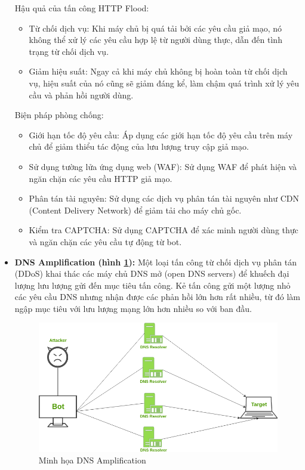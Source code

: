 \documentclass[a4paper]{article}
\begin{document}
\begin{itemize}
\begin{itemize}[label={}]
    \end{itemize}
    Hậu quả của tấn công HTTP Flood:
    \begin{itemize}[label={}]
        \item Từ chối dịch vụ: Khi máy chủ bị quá tải bởi các yêu cầu giả mạo, nó không thể xử lý các yêu cầu hợp lệ từ người dùng thực, dẫn đến tình trạng từ chối dịch vụ.
        \item Giảm hiệu suất: Ngay cả khi máy chủ không bị hoàn toàn từ chối dịch vụ, hiệu suất của nó cũng sẽ giảm đáng kể, làm chậm quá trình xử lý yêu cầu và phản hồi người dùng.
    \end{itemize}
    Biện pháp phòng chống:
    \begin{itemize}[label={}]
        \item Giới hạn tốc độ yêu cầu: Áp dụng các giới hạn tốc độ yêu cầu trên máy chủ để giảm thiểu tác động của lưu lượng truy cập giả mạo.
        \item Sử dụng tường lửa ứng dụng web (WAF): Sử dụng WAF để phát hiện và ngăn chặn các yêu cầu HTTP giả mạo.
        \item Phân tán tài nguyên: Sử dụng các dịch vụ phân tán tài nguyên như CDN (Content Delivery Network) để giảm tải cho máy chủ gốc.
        \item Kiểm tra CAPTCHA: Sử dụng CAPTCHA để xác minh người dùng thực và ngăn chặn các yêu cầu tự động từ bot.
    \end{itemize}
    \item \textbf{DNS Amplification (hình \ref{fig:DNS_amplification}): }Một loại tấn công từ chối dịch vụ phân tán (DDoS) khai thác các máy chủ DNS mở (open DNS servers) để khuếch đại lượng lưu lượng gửi đến mục tiêu tấn công. Kẻ tấn công gửi một lượng nhỏ các yêu cầu DNS nhưng nhận được các phản hồi lớn hơn rất nhiều, từ đó làm ngập mục tiêu với lưu lượng mạng lớn hơn nhiều so với ban đầu.
    \begin{figure}
        \centering
        \includegraphics[width=0.6\linewidth]{images/DNS_amplification.png}
        \caption{Minh họa DNS Amplification\cite{geeksforgeeks_ddos_2}}
        \label{fig:DNS_amplification}
    \end{figure} 
\end{itemize}
\end{document}

